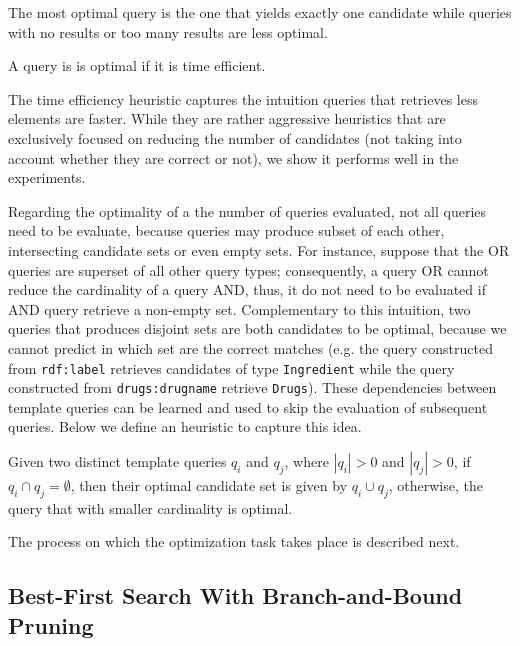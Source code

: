 \begin{definition} The most optimal query is the one that yields exactly one candidate while queries with no results or too many results are less optimal. 
\end{definition} 
\begin{definition} A query is is optimal if it is time efficient.
\end{definition} 
The time efficiency heuristic captures the intuition queries that retrieves less elements are faster. While they are rather aggressive heuristics that are exclusively focused on reducing the number of candidates (not taking into account whether they are correct or not), we show it performs well in the experiments. 

Regarding the optimality of a the number of queries evaluated, not all queries need to be evaluate, because queries may produce subset of each other, intersecting candidate sets or even empty sets. For instance, suppose that the OR queries are superset of all other query types; consequently, a query OR cannot reduce the cardinality of a query AND, thus, it do not need to be evaluated if AND query retrieve a non-empty set. Complementary to this intuition, two queries that produces disjoint sets are both candidates to be optimal, because we cannot predict in which set are the correct matches (e.g. the query constructed from \verb+rdf:label+ retrieves candidates of type \verb+Ingredient+ while the query constructed from \verb+drugs:drugname+ retrieve \verb+Drugs+). These dependencies between template queries can be learned and used to skip the evaluation of subsequent queries.  Below we define an heuristic to capture this idea.

\begin{definition} Given two distinct template queries $q_i$ and $q_j$, where $|q_i| > 0$ and $|q_j| > 0$,  if $q_i \cap q_j = \emptyset$, then their optimal candidate set is given by $q_i \cup q_j$, otherwise, the query that with smaller cardinality is optimal.
\end{definition}  

The process on which the optimization task takes place is described next.

\subsection{Best-First Search With Branch-and-Bound Pruning} 
 
